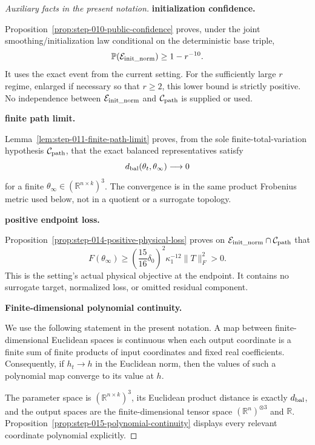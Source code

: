 \begin{proof}[Auxiliary facts in the present notation]


\medskip\noindent\textbf{initialization confidence.}\par

Proposition~\ref{prop:step-010-public-confidence} proves, under the
joint smoothing/initialization law conditional on the deterministic base
triple,
\[
  \mathbb P(\mathcal E_{\rm init\_norm})\ge1-r^{-10}.
\]
It uses the exact event from the current setting. For the sufficiently large
\(r\) regime, enlarged if necessary so that \(r\ge2\), this lower bound is
strictly positive. No independence between
\(\mathcal E_{\rm init\_norm}\) and \(\mathcal C_{\rm path}\) is supplied or
used.


\medskip\noindent\textbf{finite path limit.}\par

Lemma~\ref{lem:step-011-finite-path-limit} proves, from the sole
finite-total-variation hypothesis \(\mathcal C_{\rm path}\), that the exact
balanced representatives satisfy
\[
  d_{\rm bal}(\theta_t,\theta_\infty)\longrightarrow0
\]
for a finite \(\theta_\infty\in(\mathbb R^{n\times k})^3\). The convergence
is in the same product Frobenius metric used below, not in a quotient or a
surrogate topology.


\medskip\noindent\textbf{positive endpoint loss.}\par

Proposition~\ref{prop:step-014-positive-physical-loss} proves on
\(\mathcal E_{\rm init\_norm}\cap\mathcal C_{\rm path}\) that
\[
  F(\theta_\infty)
  \ge\left(\frac{15}{16}\delta_0\right)^2
      \kappa_1^{-12}\|T\|_F^2>0.
\]
This is the setting's actual physical objective at the endpoint. It
contains no surrogate target, normalized loss, or omitted residual component.


\medskip\noindent\textbf{Finite-dimensional polynomial continuity.}\par

We use the following statement in the present notation. A map between finite-dimensional Euclidean spaces is
continuous when each output coordinate is a finite sum of finite products of
input coordinates and fixed real coefficients. Consequently, if
\(h_t\to h\) in the Euclidean norm, then the values of such a polynomial map
converge to its value at \(h\).

The parameter space is
\((\mathbb R^{n\times k})^3\), its Euclidean product distance is exactly
\(d_{\rm bal}\), and the output spaces are the finite-dimensional tensor
space \((\mathbb R^n)^{\otimes3}\) and \(\mathbb R\). Proposition~\ref{prop:step-015-polynomial-continuity}
displays every relevant coordinate polynomial explicitly.



\end{proof}

